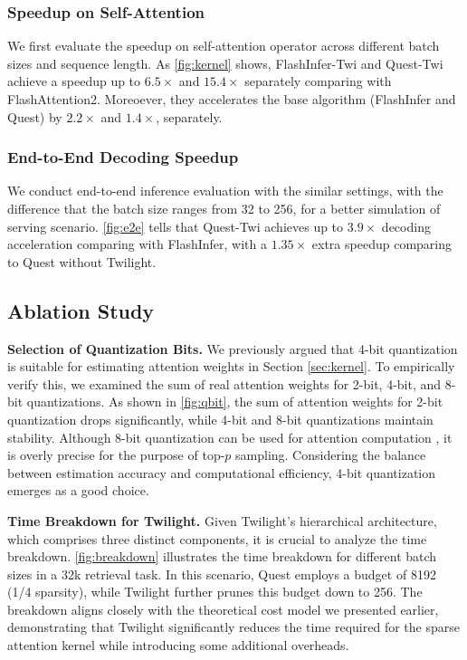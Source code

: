 \subsubsection{Speedup on Self-Attention}

We first evaluate the speedup on self-attention operator across different batch sizes and sequence length. As \autoref{fig:kernel} shows, FlashInfer-Twi and Quest-Twi achieve a speedup up to $6.5\times$ and $15.4\times$ separately comparing with FlashAttention2. Moreoever, they accelerates the base algorithm (FlashInfer and Quest) by $2.2\times$ and $1.4\times$, separately.

\subsubsection{End-to-End Decoding Speedup}
We conduct end-to-end inference evaluation with the similar settings, with the difference that the batch size ranges from 32 to 256, for a better simulation of serving scenario. \autoref{fig:e2e} tells that Quest-Twi achieves up to $3.9\times$ decoding acceleration comparing with FlashInfer, with a $1.35\times$ extra speedup comparing to Quest without Twilight.

\subsection{Ablation Study}
\textbf{Selection of Quantization Bits.} We previously argued that 4-bit quantization is suitable for estimating attention weights in Section \ref{sec:kernel}. To empirically verify this, we examined the sum of real attention weights for 2-bit, 4-bit, and 8-bit quantizations. As shown in \autoref{fig:qbit}, the sum of attention weights for 2-bit quantization drops significantly, while 4-bit and 8-bit quantizations maintain stability. Although 8-bit quantization can be used for attention computation \cite{zhang2025sageattention}, it is overly precise for the purpose of top-$p$ sampling. Considering the balance between estimation accuracy and computational efficiency, 4-bit quantization emerges as a good choice.

\textbf{Time Breakdown for Twilight.} Given Twilight's hierarchical architecture, which comprises three distinct components, it is crucial to analyze the time breakdown. \autoref{fig:breakdown} illustrates the time breakdown for different batch sizes in a 32k retrieval task. In this scenario, Quest employs a budget of 8192 (1/4 sparsity), while Twilight further prunes this budget down to 256. The breakdown aligns closely with the theoretical cost model we presented earlier, demonstrating that Twilight significantly reduces the time required for the sparse attention kernel while introducing some additional overheads.